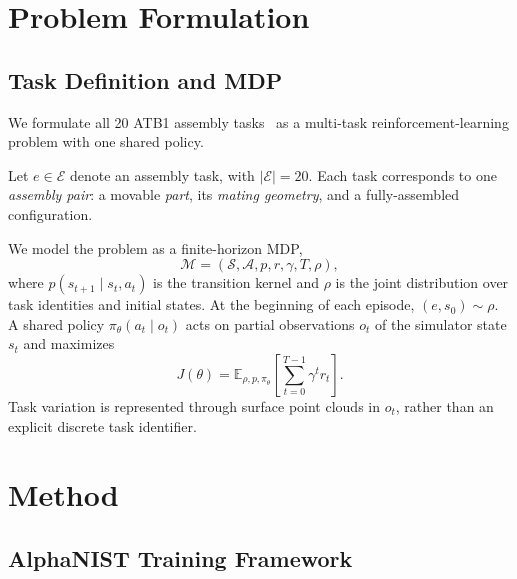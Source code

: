 \section{Problem Formulation}
\label{sec:problem-formulation}
\subsection{Task Definition and MDP}
\label{sec:task_mdp}
We formulate all 20 ATB1 assembly tasks~\cite{kimble2020benchmarking}
as a multi-task reinforcement-learning problem with one shared policy.

Let $e \in \mathcal{E}$ denote an assembly task, with $|\mathcal{E}|=20$.
Each task corresponds to one \textit{assembly pair}: a movable \textit{part}, its \textit{mating geometry}, and a fully-assembled configuration.

We model the problem as a finite-horizon MDP,
\begin{equation}
    \mathcal{M}=(\mathcal{S},\mathcal{A},p,r,\gamma,T,\rho),
\end{equation}
where $p(s_{t+1}\mid s_t,a_t)$ is the transition kernel and $\rho$
is the joint distribution over task identities and initial states.
At the beginning of each episode, $(e,s_0)\sim\rho$.
A shared policy $\pi_\theta(a_t\mid o_t)$ acts on partial observations
$o_t$ of the simulator state $s_t$ and maximizes
\begin{equation}
    J(\theta)
    =
    \mathbb{E}_{\rho,p,\pi_\theta}
    \left[
        \sum_{t=0}^{T-1}\gamma^t r_t
    \right].
    \label{eq:objective}
\end{equation}
Task variation is represented through surface point clouds in $o_t$, 
rather than an explicit discrete task identifier.

\section{Method}
\label{sec:method}
\subsection{AlphaNIST Training Framework}


